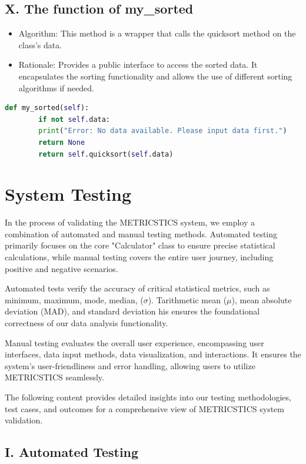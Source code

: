 \documentclass[english,12pt,a4paper]{report}
\begin{document}
	\subsection*{X. The function of my\_sorted}
	\begin{itemize}[leftmargin=*]
		\item Algorithm: This method is a wrapper that calls the quicksort method on the class's data.
		\item Rationale: Provides a public interface to access the sorted data. It encapsulates the sorting functionality and allows the use of different sorting algorithms if needed.
	\end{itemize}
	\begin{lstlisting}[language=Python, caption=My Sorted Method]
		def my_sorted(self):
		if not self.data:
		print("Error: No data available. Please input data first.")
		return None
		return self.quicksort(self.data)
	\end{lstlisting}
	
	
	\section{System Testing}
	
	\raggedright
	In the process of validating the METRICSTICS system, we employ a combination of automated and manual testing methods. Automated testing primarily focuses on the core "Calculator" class to ensure precise statistical calculations, while manual testing covers the entire user journey, including positive and negative scenarios.
	
	Automated tests verify the accuracy of critical statistical metrics, such as minimum, maximum, mode, median, ($\sigma$). Tarithmetic mean ($\mu$), mean absolute deviation (MAD), and standard deviation his ensures the foundational correctness of our data analysis functionality.
	
	Manual testing evaluates the overall user experience, encompassing user interfaces, data input methods, data visualization, and interactions. It ensures the system's user-friendliness and error handling, allowing users to utilize METRICSTICS seamlessly.
	
	The following content provides detailed insights into our testing methodologies, test cases, and outcomes for a comprehensive view of METRICSTICS system validation.
	
	\subsection*{I. Automated Testing}
	
\end{document}
